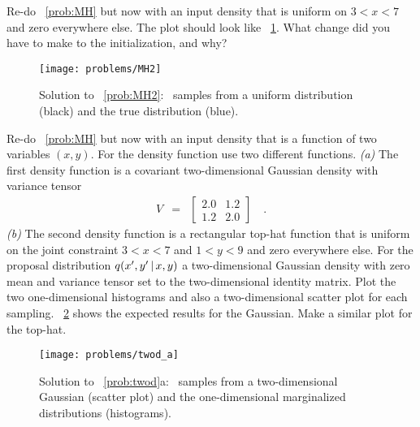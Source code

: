 \documentclass[modern]{aastex61}
\newcommand{\MCMC}{\acronym{MCMC}}
\begin{document}
\begin{problem}\label{prob:MH2}
Re-do \problemname~\ref{prob:MH} but now with an input density
that is uniform on $3<x<7$ and zero everywhere else.
The plot should look like \figurename~\ref{fig:MH2}.
What change did you have to make to the initialization, and why?
\end{problem}

\begin{figure}[!htbp]
\begin{center}
\texttt{[image: problems/MH2]}
\end{center}
\caption{Solution to \problemname~\ref{prob:MH2}:
\MCMC\ samples from a uniform distribution (black) and the true distribution
(blue).}
\label{fig:MH2}
\end{figure}

\begin{problem}\label{prob:twod}
Re-do \problemname~\ref{prob:MH} but now with an input density
that is a function of two variables $(x, y)$.
For the density function use two different functions.
\emph{(a)} The first density function is a covariant two-dimensional Gaussian
density with variance tensor
\begin{eqnarray}
V &=& \left[\begin{array}{cc} 2.0 & 1.2 \\ 1.2 & 2.0 \end{array}\right]
\quad.
\end{eqnarray}
\emph{(b)} The second density function is a rectangular top-hat function that
is uniform on the joint constraint $3<x<7$ and $1<y<9$ and zero everywhere else.
For the proposal distribution $q(x', y'\,|\, x, y)$ a two-dimensional Gaussian
density with zero mean and variance tensor set to the two-dimensional
identity matrix.
Plot the two one-dimensional histograms and also a two-dimensional scatter
plot for each sampling.
\figurename~\ref{fig:twod-a} shows the expected results for the Gaussian.
Make a similar plot for the top-hat.
\end{problem}

\begin{figure}[!htbp]
\begin{center}
\texttt{[image: problems/twod\_a]}
\end{center}
\caption{Solution to \problemname~\ref{prob:twod}a:
\MCMC\ samples from a two-dimensional Gaussian (scatter plot) and the
one-dimensional marginalized distributions (histograms).}
\label{fig:twod-a}
\end{figure}
\end{document}
